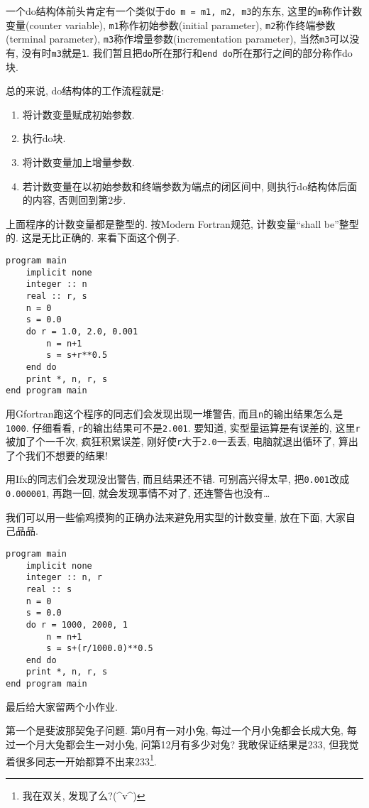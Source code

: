 一个do结构体前头肯定有一个类似于\texttt{do m = m1, m2, m3}的东东, 这里的\texttt{m}称作计数变量(counter variable), \texttt{m1}称作初始参数(initial parameter), \texttt{m2}称作终端参数(terminal parameter), \texttt{m3}称作增量参数(incrementation parameter), 当然\texttt{m3}可以没有, 没有时\texttt{m3}就是\texttt{1}. 我们暂且把\texttt{do}所在那行和\texttt{end do}所在那行之间的部分称作do块.

总的来说, do结构体的工作流程就是:
\begin{enumerate}
    \item 将计数变量赋成初始参数.
    \item 执行do块.
    \item 将计数变量加上增量参数.
    \item 若计数变量在以初始参数和终端参数为端点的闭区间中, 则执行do结构体后面的内容, 否则回到第2步.
\end{enumerate}

上面程序的计数变量都是整型的. 按Modern Fortran规范, 计数变量``shall be''整型的. 这是无比正确的. 来看下面这个例子.
\begin{lstlisting}
program main
    implicit none
    integer :: n
    real :: r, s
    n = 0
    s = 0.0
    do r = 1.0, 2.0, 0.001
        n = n+1
        s = s+r**0.5
    end do
    print *, n, r, s
end program main
\end{lstlisting}

用Gfortran跑这个程序的同志们会发现出现一堆警告, 而且\texttt{n}的输出结果怎么是\texttt{1000}. 仔细看看, \texttt{r}的输出结果可不是\texttt{2.001}. 要知道, 实型量运算是有误差的, 这里\texttt{r}被加了个一千次, 疯狂积累误差, 刚好使\texttt{r}大于\texttt{2.0}一丢丢, 电脑就退出循环了, 算出了个我们不想要的结果!

用Ifx的同志们会发现没出警告, 而且结果还不错. 可别高兴得太早, 把\texttt{0.001}改成\texttt{0.000001}, 再跑一回, 就会发现事情不对了, 还连警告也没有\dots

我们可以用一些偷鸡摸狗的正确办法来避免用实型的计数变量, 放在下面, 大家自己品品.
\begin{lstlisting}
program main
    implicit none
    integer :: n, r
    real :: s
    n = 0
    s = 0.0
    do r = 1000, 2000, 1
        n = n+1
        s = s+(r/1000.0)**0.5
    end do
    print *, n, r, s
end program main
\end{lstlisting}

最后给大家留两个小作业.

第一个是斐波那契兔子问题. 第0月有一对小兔, 每过一个月小兔都会长成大兔, 每过一个月大兔都会生一对小兔, 问第12月有多少对兔? 我敢保证结果是233, 但我觉着很多同志一开始都算不出来233\footnote{
    我在双关, 发现了么?(\^{}v\^{})
}.

